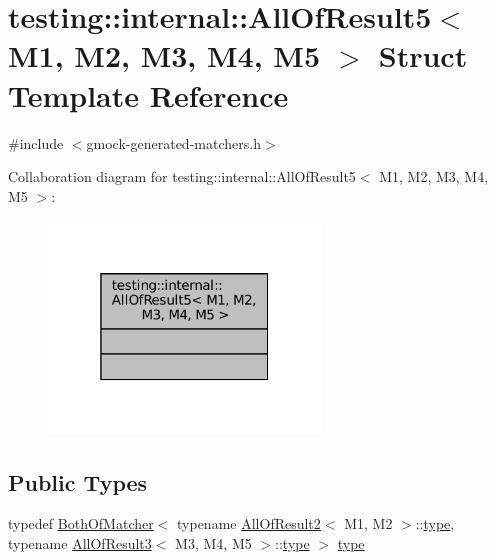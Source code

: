 \hypertarget{structtesting_1_1internal_1_1AllOfResult5}{}\section{testing\+:\+:internal\+:\+:All\+Of\+Result5$<$ M1, M2, M3, M4, M5 $>$ Struct Template Reference}
\label{structtesting_1_1internal_1_1AllOfResult5}


{\ttfamily \#include $<$gmock-\/generated-\/matchers.\+h$>$}



Collaboration diagram for testing\+:\+:internal\+:\+:All\+Of\+Result5$<$ M1, M2, M3, M4, M5 $>$\+:
\nopagebreak
\begin{figure}[H]
\begin{center}
\leavevmode
\includegraphics[width=205pt]{structtesting_1_1internal_1_1AllOfResult5__coll__graph}
\end{center}
\end{figure}
\subsection*{Public Types}
\begin{DoxyCompactItemize}
\item 
typedef \hyperlink{classtesting_1_1internal_1_1BothOfMatcher}{Both\+Of\+Matcher}$<$ typename \hyperlink{structtesting_1_1internal_1_1AllOfResult2}{All\+Of\+Result2}$<$ M1, M2 $>$\+::\hyperlink{structtesting_1_1internal_1_1AllOfResult5_aee2e1fb803f428741d147347b692d108}{type}, typename \hyperlink{structtesting_1_1internal_1_1AllOfResult3}{All\+Of\+Result3}$<$ M3, M4, M5 $>$\+::\hyperlink{structtesting_1_1internal_1_1AllOfResult5_aee2e1fb803f428741d147347b692d108}{type} $>$ \hyperlink{structtesting_1_1internal_1_1AllOfResult5_aee2e1fb803f428741d147347b692d108}{type}
\end{DoxyCompactItemize}


